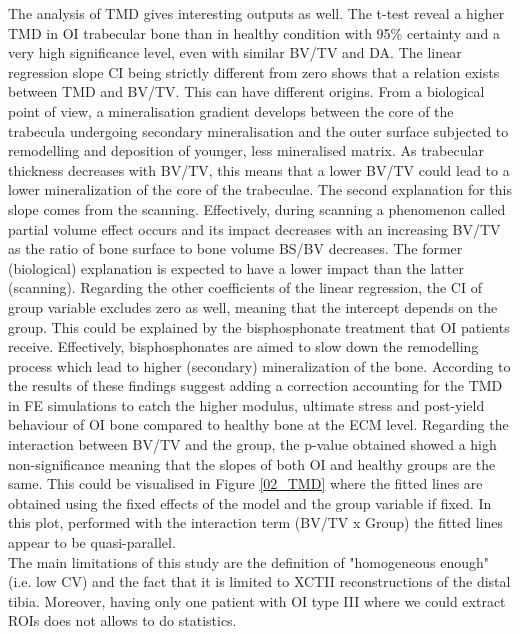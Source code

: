 \documentclass[a4paper,fleqn]{DC_ArtStyle}
\begin{document}
The analysis of TMD gives interesting outputs as well. The t-test reveal a higher TMD in OI trabecular bone than in healthy condition with 95\% certainty and a very high significance level, even with similar BV/TV and DA. The linear regression slope CI being strictly different from zero shows that a relation exists between TMD and BV/TV. This can have different origins. From a biological point of view, a mineralisation gradient develops between the core of the trabecula undergoing secondary mineralisation and the outer surface subjected to remodelling and deposition of younger, less mineralised matrix. As trabecular thickness decreases with BV/TV, this means that a lower BV/TV could lead to a lower mineralization of the core of the trabeculae. The second explanation for this slope comes from the scanning. Effectively, during scanning a phenomenon called partial volume effect occurs and its impact decreases with an increasing BV/TV as the ratio of bone surface to bone volume BS/BV decreases. The former (biological) explanation is expected to have a lower impact than the latter (scanning). Regarding the other coefficients of the linear regression, the CI of group variable excludes zero as well, meaning that the intercept depends on the group. This could be explained by the bisphosphonate treatment that OI patients receive. Effectively, bisphosphonates are aimed to slow down the remodelling process which lead to higher (secondary) mineralization of the bone. According to the results of \citeauthor{Indermaur2021}\cite{Indermaur2021} these findings suggest adding a correction accounting for the TMD in FE simulations to catch the higher modulus, ultimate stress and post-yield behaviour of OI bone compared to healthy bone at the ECM level. Regarding the interaction between BV/TV and the group, the p-value obtained showed a high non-significance meaning that the slopes of both OI and healthy groups are the same. This could be visualised in Figure \ref{02_TMD} where the fitted lines are obtained using the fixed effects of the model and the group variable if fixed. In this plot, performed with the interaction term (BV/TV x Group) the fitted lines appear to be quasi-parallel. \\
The main limitations of this study are the definition of "homogeneous enough" (i.e. low CV) and the fact that it is limited to  XCTII reconstructions of the distal tibia. Moreover, having only one patient with OI type III where we could extract ROIs does not allows to do statistics. %
\end{document}
